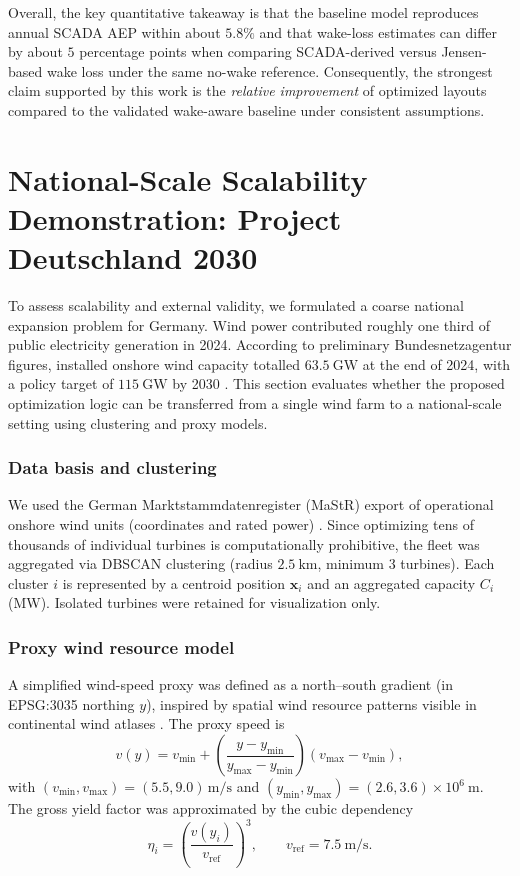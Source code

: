 \documentclass[lettersize,journal]{IEEEtran}
\begin{document}
Overall, the key quantitative takeaway is that the baseline model reproduces annual SCADA AEP within about $5.8\%$ and that wake-loss estimates can differ by about $5$ percentage points when comparing SCADA-derived versus Jensen-based wake loss under the same no-wake reference. Consequently, the strongest claim supported by this work is the \emph{relative improvement} of optimized layouts compared to the validated wake-aware baseline under consistent assumptions.


\section{National-Scale Scalability Demonstration: Project Deutschland 2030}
\label{sec:germany2030}

To assess scalability and external validity, we formulated a coarse national expansion problem for Germany. Wind power contributed roughly one third of public electricity generation in 2024. According to preliminary Bundesnetzagentur figures, installed onshore wind capacity totalled $63.5~\mathrm{GW}$ at the end of 2024, with a policy target of $115~\mathrm{GW}$ by 2030 \cite{bnetza2025renewables2024}. This section evaluates whether the proposed optimization logic can be transferred from a single wind farm to a national-scale setting using clustering and proxy models.

\subsubsection{Data basis and clustering}
We used the German Marktstammdatenregister (MaStR) export of operational onshore wind units (coordinates and rated power) \cite{bnetza_mastr}. Since optimizing tens of thousands of individual turbines is computationally prohibitive, the fleet was aggregated via DBSCAN clustering (radius $2.5~\mathrm{km}$, minimum 3 turbines). Each cluster $i$ is represented by a centroid position $\mathbf{x}_i$ and an aggregated capacity $C_i$ (MW). Isolated turbines were retained for visualization only.

\subsubsection{Proxy wind resource model}
A simplified wind-speed proxy was defined as a north--south gradient (in EPSG:3035 northing $y$), inspired by spatial wind resource patterns visible in continental wind atlases \cite{globalwindatlas}. The proxy speed is
\begin{equation}
v(y)=v_{\min}+\left(\frac{y-y_{\min}}{y_{\max}-y_{\min}}\right)\left(v_{\max}-v_{\min}\right),
\end{equation}
with $(v_{\min},v_{\max})=(5.5,9.0)\,\mathrm{m/s}$ and $(y_{\min},y_{\max})=(2.6,3.6)\times 10^6~\mathrm{m}$.
The gross yield factor was approximated by the cubic dependency
\begin{equation}
\eta_i = \left(\frac{v(y_i)}{v_{\mathrm{ref}}}\right)^3,\qquad v_{\mathrm{ref}}=7.5~\mathrm{m/s}.
\end{equation}
\end{document}
